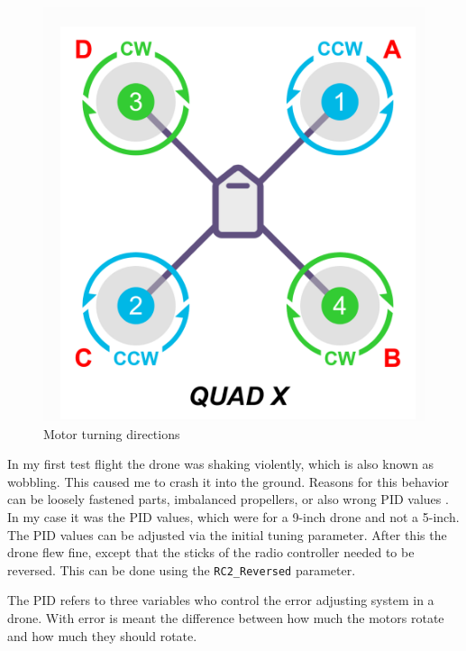 \documentclass[svgnames]{article}
\begin{document}
\begin{figure}[ht]
	\centering
	\includegraphics[scale=0.4]{pictures/quadx}
	\caption{Motor turning directions}
	\label{fig:quadx}
\end{figure}

	In my first test flight the drone was shaking violently, which is also known as wobbling. This caused me to crash it into the ground. Reasons for this behavior can be loosely fastened parts, imbalanced propellers, or also wrong \gls{PID} values \cite{dronewobblevideo}. In my case it was the \gls{PID} values, which were for a 9-inch drone and not a 5-inch. The \gls{PID} values can be adjusted via the initial tuning parameter. After this the drone flew fine, except that the sticks of the radio controller needed to be reversed. This can be done using the \lstinline|RC2_Reversed| parameter.

	\begin{Explanation}
		\item The \gls{PID} refers to three variables who control the error adjusting system in a drone. With error is meant the difference between how much the motors rotate and how much they should rotate. 
	\end{Explanation}
	
\end{document}
